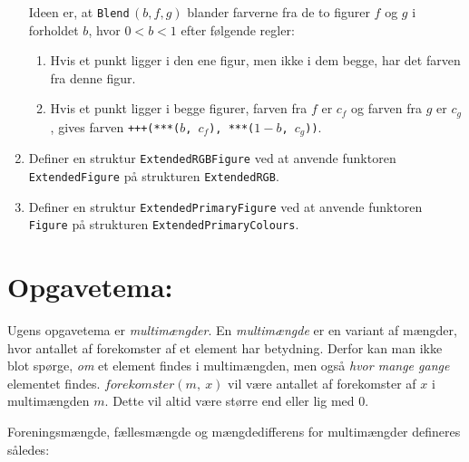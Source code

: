 \documentclass[a4paper,12pt]{article}
\begin{document}
\begin{enumerate}[{7}F1]
  Ideen er, at \lstinline{Blend}\,$(b,f,g)$ blander farverne fra de to
  figurer $f$ og $g$ i forholdet $b$, hvor $0<b<1$ efter følgende regler:

  \begin{enumerate}[1.]
  \item Hvis et punkt ligger i den ene figur, men ikke i dem begge,
    har det farven fra denne figur.
  \item Hvis et punkt ligger i begge figurer, farven fra $f$ er $c_f$
    og farven fra $g$ er $c_g$, gives farven
    \texttt{+++(***($b$,\,$c_f$),\,***($1{-}b$,\,$c_g$))}.
  \end{enumerate}

\item Definer en struktur \lstinline{ExtendedRGBFigure} ved at anvende
  funktoren \lstinline{ExtendedFigure} på strukturen \lstinline{ExtendedRGB}.

\item Definer en struktur \lstinline{ExtendedPrimaryFigure} ved at anvende
  funktoren \lstinline{Figure} på strukturen \lstinline{ExtendedPrimaryColours}.

\end{enumerate}


\newpage
\section{Opgavetema: }\label{tema}

\newcommand{\forekomster}{\textit{forekomster}}

Ugens opgavetema er \emph{multimængder}.
En \emph{multimængde} er en variant af mængder, hvor antallet af
forekomster af et element har betydning.  Derfor kan man ikke blot
spørge, \emph{om} et element findes i multimængden, men også
\emph{hvor mange gange} elementet findes. $\forekomster(m,~x)$ vil være
antallet af forekomster af $x$ i multimængden $m$.  Dette vil altid
være større end eller lig med 0.

Foreningsmængde, fællesmængde og mængdedifferens for multimængder
defineres således:
\end{document}
